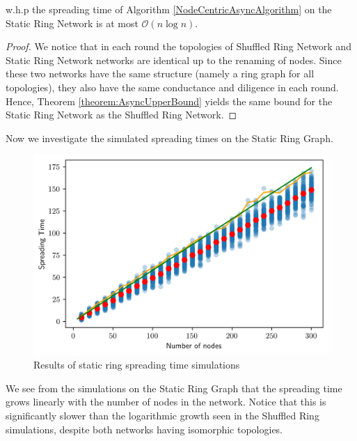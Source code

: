 \begin{theorem}\label{theorem:staticRingAsyncBound}
	w.h.p the spreading time of Algorithm \ref{NodeCentricAsyncAlgorithm} on the Static Ring Network is at most $\mathcal{O}(n \log n)$.
\end{theorem}

\begin{proof}
	We notice that in each round the topologies of Shuffled Ring Network and Static Ring Network networks are identical up to the renaming of nodes. Since these two networks have the same structure (namely a ring graph for all topologies), they also have the same conductance and diligence in each round. Hence, Theorem \ref{theorem:AsyncUpperBound} yields the same bound for the Static Ring Network as the Shuffled Ring Network. %
\end{proof}


Now we investigate the simulated spreading times on the Static Ring Graph.

\begin{figure}[h]
	\centering
	\includegraphics[width=1\textwidth]{./figures/static_ring_simulation_results.png}
	\caption{Results of static ring spreading time simulations}
	\label{fig:staticRingSimResults}
\end{figure}

We see from the simulations on the Static Ring Graph that the spreading time grows linearly with the number of nodes in the network. Notice that this is significantly slower than the logarithmic growth seen in the Shuffled Ring simulations, despite both networks having isomorphic topologies. %

